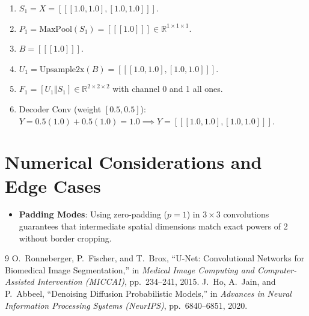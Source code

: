 \documentclass[11pt,a4paper]{article}
\theoremstyle{definition}
\begin{document}
\begin{enumerate}
    \item $S_1 = X = [[[1.0, 1.0], [1.0, 1.0]]]$.
    \item $P_1 = \text{MaxPool}(S_1) = [[[1.0]]] \in \mathbb{R}^{1 \times 1 \times 1}$.
    \item $B = [[[1.0]]]$.
    \item $U_1 = \text{Upsample2x}(B) = [[[1.0, 1.0], [1.0, 1.0]]]$.
    \item $F_1 = [U_1 \mathbin{\Vert} S_1] \in \mathbb{R}^{2 \times 2 \times 2}$ with channel 0 and 1 all ones.
    \item Decoder Conv (weight $[0.5, 0.5]$):
    $Y = 0.5(1.0) + 0.5(1.0) = 1.0 \implies Y = [[[1.0, 1.0], [1.0, 1.0]]]$.
\end{enumerate}

\section{Numerical Considerations and Edge Cases}

\begin{itemize}
    \item \textbf{Padding Modes}: Using zero-padding ($p=1$) in $3 \times 3$ convolutions guarantees that intermediate spatial dimensions match exact powers of 2 without border cropping.
\end{itemize}

\begin{thebibliography}{9}
 O.~Ronneberger, P.~Fischer, and T.~Brox, ``U-Net: Convolutional Networks for Biomedical Image Segmentation,'' in \emph{Medical Image Computing and Computer-Assisted Intervention (MICCAI)}, pp.~234--241, 2015.
 J.~Ho, A.~Jain, and P.~Abbeel, ``Denoising Diffusion Probabilistic Models,'' in \emph{Advances in Neural Information Processing Systems (NeurIPS)}, pp.~6840--6851, 2020.
\end{thebibliography}
\end{document}
